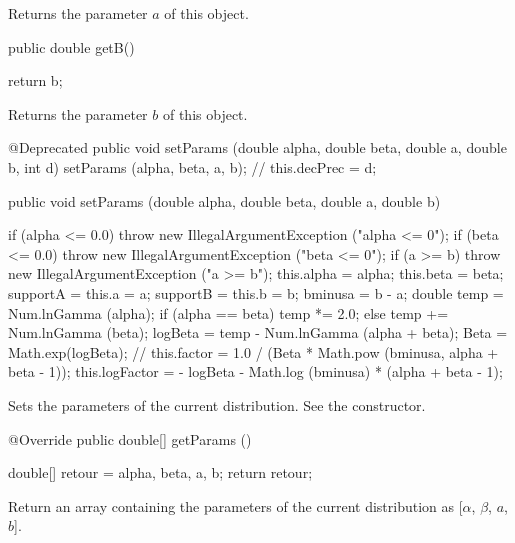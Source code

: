   \begin{tabb} Returns the parameter $a$ of this object.
  \end{tabb}
\begin{code}

   public double getB()\begin{hide} {
      return b;
   }\end{hide}
\end{code}
\begin{tabb} Returns the parameter $b$ of this object.
\end{tabb}
\begin{code}\begin{hide}
   @Deprecated
   public void setParams (double alpha, double beta,
                          double a, double b, int d) {
      setParams (alpha, beta, a, b);
   //   this.decPrec = d;
    }\end{hide}

   public void setParams (double alpha, double beta, double a, double b)\begin{hide} {
      if (alpha <= 0.0)
         throw new IllegalArgumentException ("alpha <= 0");
      if (beta <= 0.0)
         throw new IllegalArgumentException ("beta <= 0");
      if (a >= b)
         throw new IllegalArgumentException ("a >= b");
      this.alpha = alpha;
      this.beta = beta;
      supportA = this.a = a;
      supportB = this.b = b;
      bminusa = b - a;
      double temp = Num.lnGamma (alpha);
      if (alpha == beta)
         temp *= 2.0;
      else
         temp += Num.lnGamma (beta);
      logBeta = temp - Num.lnGamma (alpha + beta);
      Beta = Math.exp(logBeta);
//      this.factor = 1.0 / (Beta * Math.pow (bminusa, alpha + beta - 1));
      this.logFactor = - logBeta - Math.log (bminusa) * (alpha + beta - 1);
    }\end{hide}
\end{code}
\begin{tabb}
   Sets the parameters of the current distribution. See the constructor.
\end{tabb}
\begin{code}

   @Override
   public double[] getParams ()\begin{hide} {
      double[] retour = {alpha, beta, a, b};
      return retour;
   }\end{hide}
\end{code}
\begin{tabb}
   Return an array containing the parameters of the current distribution as [$\alpha$, $\beta$, $a$, $b$].
\end{tabb}
